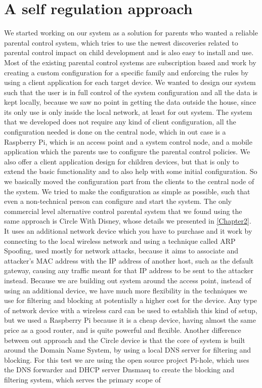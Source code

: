 
\chapter{A self regulation approach} %

\label{Chapter3} %

We started working on our system as a solution for parents who wanted a reliable parental control system, which tries to use the newest discoveries related to parental control impact on child development and is also easy to install and use. Most of the existing parental control systems are subscription based and work by creating a custom configuration for a specific family and enforcing the rules by using a client application for each target device. We wanted to design our system such that the user is in full control of the system configuration and all the data is kept locally, because we saw no point in getting the data outside the house, since its only use is only inside the local network, at least for out system. The system that we developed does not require any kind of client configuration, all the configuration needed is done on the central node, which in out case is a Raspberry Pi, which is an access point and a system control node, and a mobile application which the parents use to configure the parental control policies. We also offer a client application design for children devices, but that is only to extend the basic functionality and to also help with some initial configuration. So we basically moved the configuration part from the clients to the central node of the system. We tried to make the configuration as simple as possible, such that even a non-technical person can configure and start the system. The only commercial level alternative control parental system that we found using the same approach is Circle With Disney, whose details we presented in \ref{Chapter2}. It uses an additional network device which you have to purchase and it work by connecting to the local wireless network and using a technique called ARP Spoofing, used mostly for network attacks, because it aims to associate and attacker's MAC address with the IP address of another host, such as the default gateway, causing any traffic meant for that IP address to be sent to the attacker instead. Because we are building out system around the access point, instead of using an additional device, we have much more flexibility in the techniques we use for filtering and blocking at potentially a higher cost for the device. Any type of network device with a wireless card can be used to establish this kind of setup, but we used a Raspberry Pi because it is a cheap device, having almost the same price as a good router, and is quite powerful and flexible. Another difference between out approach and the Circle device is that the core of system is built around the  Domain Name System, by using a local DNS server for filtering and blocking. For this test we are using the open source project Pi-hole, which uses the DNS forwarder and DHCP server Dnsmasq to create the blocking and filtering system, which serves the primary scope of 
